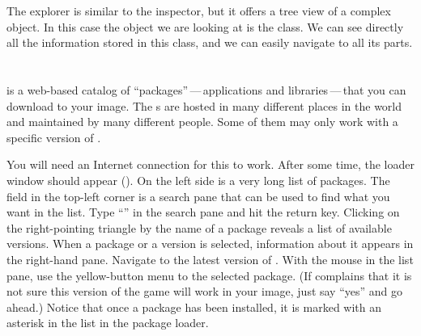 \documentclass[a4paper,10pt,twoside]{book}
\begin{document}
The explorer is similar to the inspector, but it offers a tree view of a complex object.
In this case the object we are looking at is the  class.
We can see directly all the information stored in this class, and we can easily navigate to all its parts.

\section{\sqmap}

\sqmap is a web-based catalog of ``packages''\,---\,applications and libraries\,---\,that you can download to your image.
The s are hosted in many different places in the world and maintained by many different people. Some of them may only work with a specific version of \sq.

You will need an Internet connection for this to work.  After some time, the \sqmap loader window should appear ().
On the left side is a very long list of packages.
The field in the top-left corner is a search pane that can be used to find what you want in the list.
Type ``'' in the search pane and hit the return key.
Clicking on the right-pointing triangle by the name of a package reveals a list of available versions. When a package or a version is selected, information about it appears in the right-hand pane.
Navigate to the latest version of .
With the mouse in the list pane, use the yellow-button menu to  the selected package.
(If \sq complains that it is not sure this version of the game will work in your image, just say ``yes'' and go ahead.)
Notice that once a package has been installed, it is marked with an asterisk in the list in the \sqmap package loader. 
\end{document}
